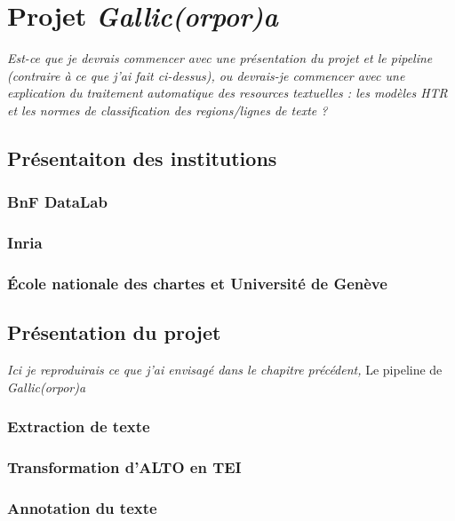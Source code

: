 \documentclass[a4paper,12pt,twoside]{book}
\begin{document}
	\chapter{Projet \textit{Gallic(orpor)a}}
	
	\textit{Est-ce que je devrais commencer avec une présentation du projet et le pipeline (contraire à ce que j'ai fait ci-dessus), ou devrais-je commencer avec une explication du traitement automatique des resources textuelles : les modèles HTR et les normes de classification des regions/lignes de texte ?}
	
	\section{Présentaiton des institutions}
	
	\subsection{BnF DataLab}
	
	\subsection{Inria}
	
	\subsection{École nationale des chartes et Université de Genève}
	
	\section{Présentation du projet}
	
	\textit{Ici je reproduirais ce que j'ai envisagé dans le chapitre précédent,} \og{} Le pipeline de \textit{Gallic(orpor)a} \fg{}
	
	\subsection{Extraction de texte}
		
	\subsection{Transformation d'ALTO en TEI}
		
	\subsection{Annotation du texte}
		
\end{document}
